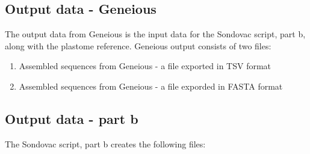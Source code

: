 \subsection{Output data - Geneious}

The output data from Geneious is the input data for the Sondovac script, part b, along with the plastome reference. 
Geneious output consists of two files: 
\begin{enumerate}
\item Assembled sequences from Geneious - a file exported in TSV format
\item Assembled sequences from Geneious - a file exporded in FASTA format
\end{enumerate}

\subsection{Output data - part b}

The Sondovac script, part b creates the following files: 

